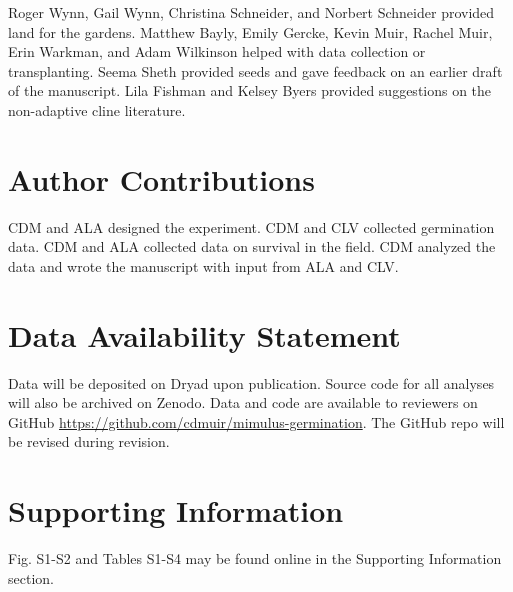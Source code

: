 \documentclass[
  12pt,
]{article}
\begin{document}
Roger Wynn, Gail Wynn, Christina Schneider, and Norbert Schneider provided land for the gardens. Matthew Bayly, Emily Gercke, Kevin Muir, Rachel Muir, Erin Warkman, and Adam Wilkinson helped with data collection or transplanting. Seema Sheth provided seeds and gave feedback on an earlier draft of the manuscript. Lila Fishman and Kelsey Byers provided suggestions on the non-adaptive cline literature.

\hypertarget{author-contributions}{%
\section{Author Contributions}\label{author-contributions}}

CDM and ALA designed the experiment. CDM and CLV collected germination data. CDM and ALA collected data on survival in the field. CDM analyzed the data and wrote the manuscript with input from ALA and CLV.

\hypertarget{data-availability-statement}{%
\section{Data Availability Statement}\label{data-availability-statement}}

Data will be deposited on Dryad upon publication. Source code for all analyses will also be archived on Zenodo. Data and code are available to reviewers on GitHub \url{https://github.com/cdmuir/mimulus-germination}. The GitHub repo will be revised during revision.

\hypertarget{supporting-information}{%
\section{Supporting Information}\label{supporting-information}}

Fig. S1-S2 and Tables S1-S4 may be found online in the Supporting Information section.

\renewcommand\thefigure{S\arabic{figure}}    
\renewcommand\thetable{S\arabic{table}}    
\setcounter{figure}{0}    
\setcounter{table}{0}

\begin{figure}[ht]
  \captionsetup{labelformat=empty}
  \caption{}
  \label{fig:pp_check}
\end{figure}

\begin{figure}[ht]
  \captionsetup{labelformat=empty}
  \caption{}
  \label{fig:climate}
\end{figure}
\end{document}
